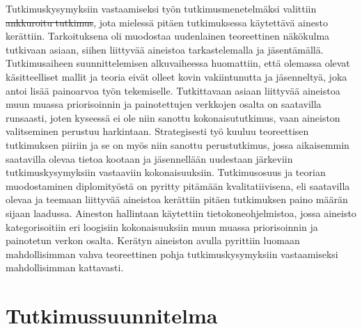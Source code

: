 Tutkimuskysymyksiin vastaamiseksi työn tutkimusmenetelmäksi valittiin \st{ankkuroitu tutkimus}, jota mielessä pitäen tutkimuksessa käytettävä ainesto kerättiin.
Tarkoituksena oli muodostaa uudenlainen teoreettinen näkökulma tutkivaan asiaan, siihen liittyvää aineistoa tarkastelemalla ja jäsentämällä.
Tutkimusaiheen suunnittelemisen alkuvaiheessa huomattiin, että olemassa olevat käsitteelliset mallit ja teoria eivät olleet kovin vakiintunutta ja jäsenneltyä, joka antoi lisää painoarvoa työn tekemiselle.
Tutkittavaan asiaan liittyvää aineistoa muun muassa priorisoinnin ja painotettujen verkkojen osalta on saatavilla runsaasti, joten kyseessä ei ole niin sanottu kokonaisututkimus, vaan aineiston valitseminen perustuu harkintaan.
Strategisesti työ kuuluu teoreettisen tutkimuksen piiriin ja se on myös niin sanottu perustutkimus, jossa aikaisemmin saatavilla olevaa tietoa kootaan ja jäsennellään uudestaan järkeviin tutkimuskysymyksiin vastaaviin kokonaisuuksiin.
Tutkimusosuus ja teorian muodostaminen diplomityöstä on pyritty pitämään kvalitatiivisena, eli saatavilla olevaa ja teemaan liittyvää aineistoa kerättiin pitäen tutkimuksen paino määrän sijaan laadussa.
Aineston hallintaan käytettiin tietokoneohjelmistoa, jossa aineisto kategorisoitiin eri loogisiin kokonaisuuksiin muun muassa priorisoinnin ja painotetun verkon osalta.
Kerätyn aineiston avulla pyrittiin luomaan mahdollisimman vahva teoreettinen pohja tutkimuskysymyksiin vastaamiseksi mahdollisimman kattavasti.

\section{Tutkimussuunnitelma}

